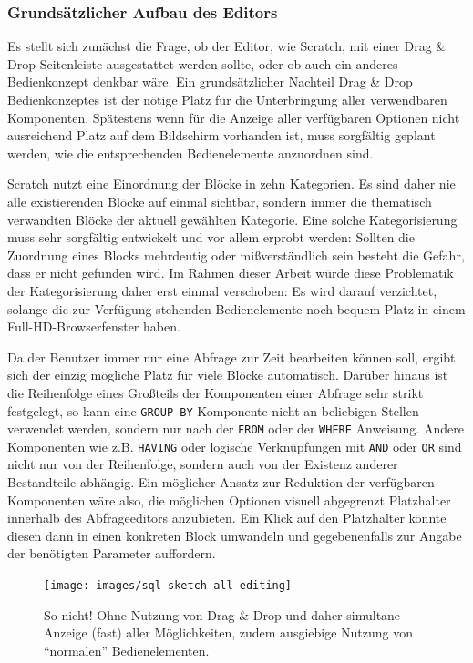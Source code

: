 \subsubsection{Grundsätzlicher Aufbau des Editors}

Es stellt sich zunächst die Frage, ob der Editor, wie Scratch, mit einer Drag \& Drop Seitenleiste ausgestattet werden sollte, oder ob auch ein anderes Bedienkonzept denkbar wäre. Ein grundsätzlicher Nachteil Drag \& Drop Bedienkonzeptes ist der nötige Platz für die Unterbringung aller verwendbaren Komponenten. Spätestens wenn für die Anzeige aller verfügbaren Optionen nicht ausreichend Platz auf dem Bildschirm vorhanden ist, muss sorgfältig geplant werden, wie die entsprechenden Bedienelemente anzuordnen sind.

Scratch nutzt eine Einordnung der Blöcke in zehn Kategorien. Es sind daher nie alle existierenden Blöcke auf einmal sichtbar, sondern immer die thematisch verwandten Blöcke der aktuell gewählten Kategorie. Eine solche Kategorisierung muss sehr sorgfältig entwickelt und vor allem erprobt werden: Sollten die Zuordnung eines Blocks mehrdeutig oder mißverständlich sein besteht die Gefahr, dass er nicht gefunden wird. Im Rahmen dieser Arbeit würde diese Problematik der Kategorisierung daher erst einmal verschoben: Es wird darauf verzichtet, solange die zur Verfügung stehenden Bedienelemente noch bequem Platz in einem Full-HD-Browserfenster haben.

Da der Benutzer immer nur eine Abfrage zur Zeit bearbeiten können soll, ergibt sich der einzig mögliche Platz für viele Blöcke automatisch. Darüber hinaus ist die Reihenfolge eines Großteils der Komponenten einer Abfrage sehr strikt festgelegt, so kann eine \texttt{GROUP BY} Komponente nicht an beliebigen Stellen verwendet werden, sondern nur nach der \texttt{FROM} oder der \texttt{WHERE} Anweisung. Andere Komponenten wie z.B. \texttt{HAVING} oder logische Verknüpfungen mit \texttt{AND} oder \texttt{OR} sind nicht nur von der Reihenfolge, sondern auch von der Existenz anderer Bestandteile abhängig. Ein möglicher Ansatz zur Reduktion der verfügbaren Komponenten wäre also, die möglichen Optionen visuell abgegrenzt Platzhalter innerhalb des Abfrageeditors anzubieten. Ein Klick auf den Platzhalter könnte diesen dann in einen konkreten Block umwandeln und gegebenenfalls zur Angabe der benötigten Parameter auffordern.

\begin{figure}[p]
  \texttt{[image: images/sql-sketch-all-editing]}
  \caption{So nicht! Ohne Nutzung von Drag \& Drop und daher simultane Anzeige (fast) aller Möglichkeiten, zudem ausgiebige Nutzung von "`normalen"' Bedienelementen.}
  \label{fig:screen-sql-editor-all-editing}
\end{figure}

